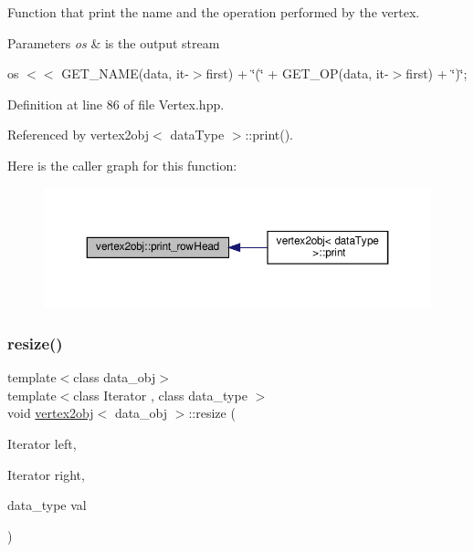 Function that print the name and the operation performed by the vertex. 


\begin{DoxyParams}{Parameters}
{\em os} & is the output stream \\
\hline
\end{DoxyParams}
os $<$$<$ G\+E\+T\+\_\+\+N\+A\+ME(data, it-\/$>$first) + \char`\"{}(\char`\"{} + G\+E\+T\+\_\+\+OP(data, it-\/$>$first) + \char`\"{})\char`\"{}; 

Definition at line 86 of file Vertex.\+hpp.



Referenced by vertex2obj$<$ data\+Type $>$\+::print().

Here is the caller graph for this function\+:
\nopagebreak
\begin{figure}[H]
\begin{center}
\leavevmode
\includegraphics[width=350pt]{d4/d5c/structvertex2obj_aa339d6dd020c8d0166311a129a9182b5_icgraph}
\end{center}
\end{figure}
\mbox{\label{structvertex2obj_aab30f1c6b751f7679864447ce2f795e2}} 
\subsubsection{\texorpdfstring{resize()}{resize()}}
{\footnotesize\ttfamily template$<$class data\+\_\+obj$>$ \\
template$<$class Iterator , class data\+\_\+type $>$ \\
void \hyperlink{structvertex2obj}{vertex2obj}$<$ data\+\_\+obj $>$\+::resize (\begin{DoxyParamCaption}\item[{Iterator}]{left,  }\item[{Iterator}]{right,  }\item[{data\+\_\+type}]{val }\end{DoxyParamCaption})\hspace{0.3cm}{\ttfamily [inline]}}



